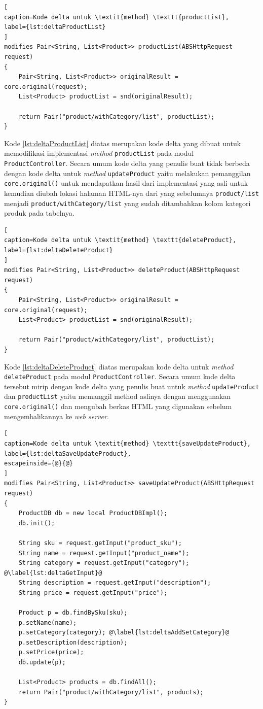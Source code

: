 \begin{lstlisting}[
caption=Kode delta untuk \textit{method} \texttt{productList},
label={lst:deltaProductList}
]
modifies Pair<String, List<Product>> productList(ABSHttpRequest request)
{
	Pair<String, List<Product>> originalResult = core.original(request);
	List<Product> productList = snd(originalResult);
	
	return Pair("product/withCategory/list", productList);
}
\end{lstlisting}

Kode \ref{lst:deltaProductList} diatas merupakan kode delta yang dibuat untuk memodifikasi implementasi \textit{method} \texttt{productList} pada modul \texttt{ProductController}. Secara umum kode delta yang penulis buat tidak berbeda dengan kode delta untuk \textit{method} \texttt{updateProduct} yaitu melakukan pemanggilan \texttt{core.original()} untuk mendapatkan hasil dari implementasi yang asli untuk kemudian diubah lokasi halaman HTML-nya dari yang sebelumnya \texttt{product/list} menjadi \texttt{product/withCategory/list} yang sudah ditambahkan kolom kategori produk pada tabelnya.

\begin{lstlisting}[
caption=Kode delta untuk \textit{method} \texttt{deleteProduct},
label={lst:deltaDeleteProduct}
]
modifies Pair<String, List<Product>> deleteProduct(ABSHttpRequest request)
{
	Pair<String, List<Product>> originalResult = core.original(request);
	List<Product> productList = snd(originalResult);
	
	return Pair("product/withCategory/list", productList);
}
\end{lstlisting}

Kode \ref{lst:deltaDeleteProduct} diatas merupakan kode delta untuk \textit{method} \texttt{deleteProduct} pada modul \texttt{ProductController}. Secara umum kode delta tersebut mirip dengan kode delta yang penulis buat untuk \textit{method} \texttt{updateProduct} dan \texttt{productList} yaitu memanggil method aslinya dengan menggunakan \texttt{core.original()} dan mengubah berkas HTML yang digunakan sebelum mengembalikannya ke \textit{web server}.

\begin{lstlisting}[
caption=Kode delta untuk \textit{method} \texttt{saveUpdateProduct},
label={lst:deltaSaveUpdateProduct},
escapeinside={@}{@}
]
modifies Pair<String, List<Product>> saveUpdateProduct(ABSHttpRequest request)
{
	ProductDB db = new local ProductDBImpl();
	db.init();
	
	String sku = request.getInput("product_sku");
	String name = request.getInput("product_name");
	String category = request.getInput("category"); @\label{lst:deltaGetInput}@
	String description = request.getInput("description");
	String price = request.getInput("price");
	
	Product p = db.findBySku(sku);
	p.setName(name);
	p.setCategory(category); @\label{lst:deltaAddSetCategory}@
	p.setDescription(description);
	p.setPrice(price);
	db.update(p);
	
	List<Product> products = db.findAll();
	return Pair("product/withCategory/list", products);
}
\end{lstlisting}

